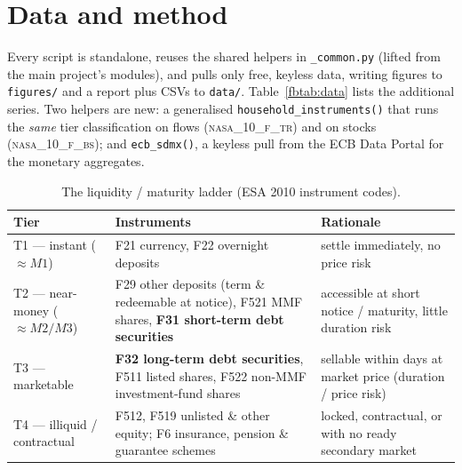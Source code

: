 \documentclass[11pt,a4paper]{article}
\newcommand{\code}[1]{\texttt{#1}}
\newcommand{\dataset}[1]{\textsc{#1}}
\begin{document}
\section{Data and method}\label{fbsec:data}

Every script is standalone, reuses the shared helpers in \code{\_common.py}
(lifted from the main project's modules), and pulls only free, keyless data,
writing figures to \code{figures/} and a report plus CSVs to \code{data/}.
Table~\ref{fbtab:data} lists the additional series. Two helpers are new: a
generalised \code{household\_instruments()} that runs the \emph{same} tier
classification on flows (\dataset{nasa\_10\_f\_tr}) and on stocks
(\dataset{nasa\_10\_f\_bs}); and \code{ecb\_sdmx()}, a keyless pull from the ECB
Data Portal for the monetary aggregates.

\begin{table}[htbp]\centering\small
\caption{The liquidity / maturity ladder (ESA 2010 instrument codes).}
\label{fbtab:ladder}
\begin{tabular}{@{}p{3.4cm}p{5.4cm}p{6.0cm}@{}}
\toprule
\textbf{Tier} & \textbf{Instruments} & \textbf{Rationale} \\
\midrule
T1 --- instant ($\approx M1$) & F21 currency, F22 overnight deposits &
  settle immediately, no price risk \\
T2 --- near-money ($\approx M2/M3$) & F29 other deposits (term \& redeemable at
  notice), F521 MMF shares, \textbf{F31 short-term debt securities} &
  accessible at short notice / maturity, little duration risk \\
T3 --- marketable & \textbf{F32 long-term debt securities}, F511 listed shares,
  F522 non-MMF investment-fund shares &
  sellable within days at market price (duration / price risk) \\
T4 --- illiquid / contractual & F512, F519 unlisted \& other equity; F6
  insurance, pension \& guarantee schemes &
  locked, contractual, or with no ready secondary market \\
\bottomrule
\end{tabular}
\end{table}
\end{document}
